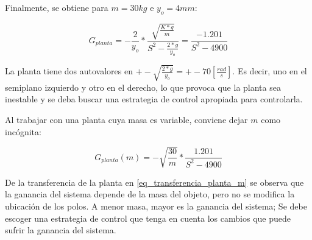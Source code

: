\noindent Finalmente, se obtiene para $m=30kg$ e $y_{o}=4mm$:

\begin{equation}
	G_{planta}=-\frac{2}{y_{o}}*\frac{\sqrt{\frac{K*g}{m}}}{S^2-\frac{2*g}{y_{o}}}=\frac{-1.201}{S^{2}-4900}
\end{equation}

\noindent La planta tiene dos autovalores en $+-\sqrt{\frac{2*g}{y_{o}}}=+-70[\frac{rad}{s}]$. Es decir, uno en el semiplano izquierdo y otro en el derecho, lo que provoca que la planta sea inestable y se deba buscar una estrategia de control apropiada para controlarla.

\noindent Al trabajar con una planta cuya masa es variable, conviene dejar $m$ como incógnita:

\begin{equation} \label{eq_transferencia_planta_m}
		G_{planta}(m)=-\sqrt{\frac{30}{m}}*\frac{1.201}{S^{2}-4900}
\end{equation}

\noindent De la transferencia de la planta en \ref{eq_transferencia_planta_m} se observa que la ganancia del sistema depende de la masa del objeto, pero no se modifica la ubicación de los polos. A menor masa, mayor es la ganancia del sistema; Se debe escoger una estrategia de control que tenga en cuenta los cambios que puede sufrir la ganancia del sistema.
